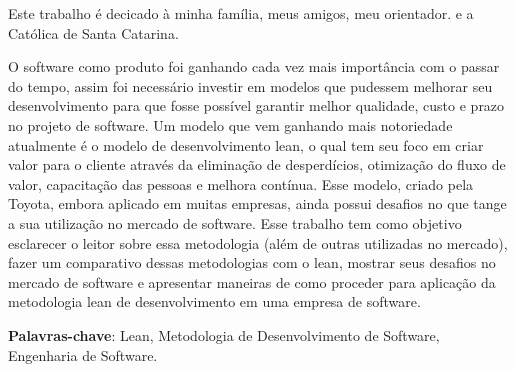 \begin{agradecimentos}

Este trabalho é decicado à minha família, meus amigos,  meu orientador. e a Católica de Santa Catarina.  

\end{agradecimentos}




\setlength{\absparsep}{18pt} 
\begin{resumo}
O software como produto foi ganhando cada vez mais importância com o passar do tempo, assim foi necessário investir em modelos que pudessem melhorar seu desenvolvimento para que fosse possível garantir melhor qualidade, custo e prazo no projeto de software. Um modelo que vem ganhando mais notoriedade atualmente é o modelo de desenvolvimento lean, o qual tem seu foco em criar valor para o cliente através da eliminação de desperdícios, otimização do fluxo de valor, capacitação das pessoas e melhora contínua. Esse modelo, criado pela Toyota, embora aplicado em muitas empresas, ainda possui desafios no que tange a sua utilização no mercado de software. Esse trabalho tem como objetivo esclarecer o leitor sobre essa metodologia (além de outras utilizadas no mercado), fazer um comparativo dessas metodologias com o lean, mostrar seus desafios no mercado de software e apresentar maneiras de como proceder para aplicação da metodologia lean de desenvolvimento em uma empresa de software.

\textbf{Palavras-chave}: Lean, Metodologia de Desenvolvimento de Software, Engenharia de Software. %

\end{resumo}
 
